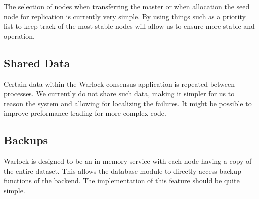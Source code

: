 The selection of nodes when transferring the master or when allocation the
seed node for replication is currently very simple. By using things such
as a priority list to keep track of the most stable nodes will allow us to
ensure more stable and operation.

\subsection{Shared Data}

Certain data within the Warlock consensus application is repeated between
processes. We currently do not share such data, making it simpler for us
to reason the system and allowing for localizing the failures. It might
be possible to improve preformance trading for more complex code.

\subsection{Backups}

Warlock is designed to be an in-memory service with each node having a copy
of the entire dataset. This allows the database module to directly access
backup functions of the backend. The implementation of this feature should be
quite simple.

